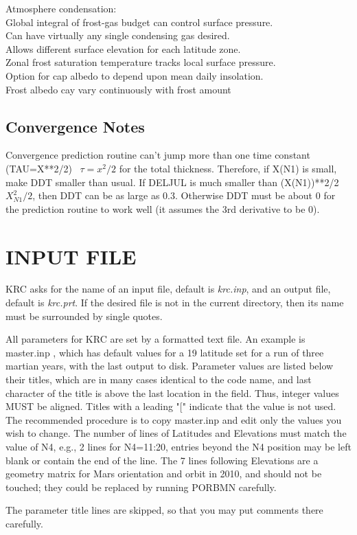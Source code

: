 \documentclass{article}
\newcommand{\qi}{\\ \hspace*{2.em}}      %
\newcommand{\qii}{\\ \hspace*{4.em}}     %
\newcommand{\nf}{\textit}  %
\begin{document}
Atmosphere condensation: 
\qi Global integral of frost-gas budget can control surface pressure.
\qii Can have virtually any single condensing gas desired.
\qi Allows different surface elevation for each latitude zone.
\qii  Zonal frost saturation temperature tracks local surface pressure.
\qi Option for cap albedo to depend upon mean daily insolation.
\qii Frost albedo cay vary continuously with frost amount

\subsection{Convergence Notes} %

Convergence prediction routine can't jump more than one time constant
(TAU=X**2/2) \ $\tau =x^2/2$ for the total thickness.  Therefore, if X(N1) is
small, make DDT smaller than usual.  If DELJUL is much smaller than (X(N1))**2/2
\ $X_{N1}^2/2$, then DDT can be as large as 0.3.  Otherwise DDT must be about 0
for the prediction routine to work well (it assumes the 3rd derivative to be 0).

\section{INPUT FILE}

KRC asks for the name of an input file, default is \nf{krc.inp}, and an output
file, default is \nf{krc.prt}. If the desired file is not in the current
directory, then its name must be surrounded by single quotes.

All parameters for KRC are set by a formatted text file.  An example is
master.inp , which has default values for a 19 latitude set for a run of three
martian years, with the last output to disk. Parameter values are listed below
their titles, which are in many cases identical to the code name, and last
character of the title is above the last location in the field. Thus, integer
values MUST be aligned. Titles with a leading "[" indicate that the value is not
used. The recommended procedure is to copy master.inp and edit only the values
you wish to change. The number of lines of Latitudes and Elevations must match
the value of N4, e.g., 2 lines for N4=11:20, entries beyond the N4 position may
be left blank or contain the end of the line. The 7 lines following Elevations
are a geometry matrix for Mars orientation and orbit in 2010, and should not be
touched; they could be replaced by running PORBMN carefully.

The parameter title lines are skipped, so that you may put comments there carefully.
\end{document}
